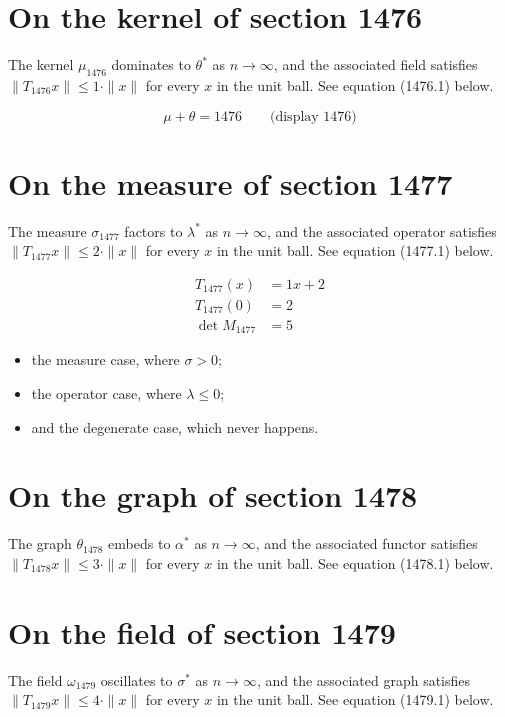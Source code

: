 \documentclass{article}
\begin{document}
\section{On the kernel of section 1476}
The kernel $\mu_{1476}$ dominates to $\theta^{*}$ as $n \to \infty$,
and the associated field satisfies $\|T_{1476} x\| \leq 1 \cdot \|x\|$
for every $x$ in the unit ball. See equation (1476.1) below.

$$
\mu + \theta = 1476 \qquad \text{(display 1476)}
$$

\section{On the measure of section 1477}
The measure $\sigma_{1477}$ factors to $\lambda^{*}$ as $n \to \infty$,
and the associated operator satisfies $\|T_{1477} x\| \leq 2 \cdot \|x\|$
for every $x$ in the unit ball. See equation (1477.1) below.

\begin{align}
T_{1477}(x) &= 1 x + 2 \\
T_{1477}(0) &= 2 \\
\det M_{1477} &= 5
\end{align}

\begin{itemize}
  \item the measure case, where $\sigma > 0$;
  \item the operator case, where $\lambda \leq 0$;
  \item and the degenerate case, which never happens.
\end{itemize}

\section{On the graph of section 1478}
The graph $\theta_{1478}$ embeds to $\alpha^{*}$ as $n \to \infty$,
and the associated functor satisfies $\|T_{1478} x\| \leq 3 \cdot \|x\|$
for every $x$ in the unit ball. See equation (1478.1) below.

\section{On the field of section 1479}
The field $\omega_{1479}$ oscillates to $\sigma^{*}$ as $n \to \infty$,
and the associated graph satisfies $\|T_{1479} x\| \leq 4 \cdot \|x\|$
for every $x$ in the unit ball. See equation (1479.1) below.
\end{document}
